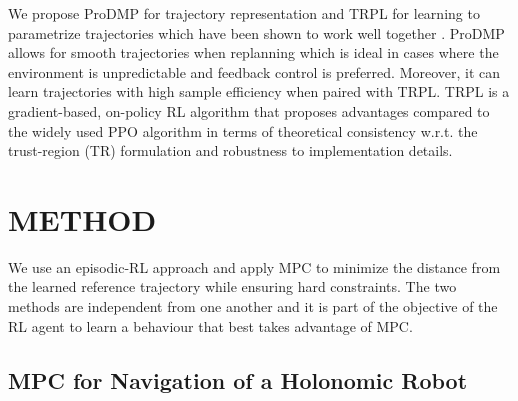 \documentclass[letterpaper,conference,10pt]{IEEEconf}
\begin{document}
We propose ProDMP \cite{paraschos_probabilistic_2013,li_prodmps_2022} for trajectory representation and TRPL \cite{otto_differentiable_2020} for learning to parametrize trajectories which have been shown to work well together \cite{otto_deep_2023}. ProDMP allows for smooth trajectories when replanning which is ideal in cases where the environment is unpredictable and feedback control is preferred. Moreover, it can learn trajectories with high sample efficiency when paired with TRPL. TRPL is a gradient-based, on-policy RL algorithm that proposes advantages compared to the widely used PPO algorithm in terms of theoretical consistency w.r.t. the trust-region (TR) formulation and robustness to implementation details.

\section{METHOD}

We use an episodic-RL approach and apply MPC to minimize the distance from the learned reference trajectory while ensuring hard constraints. The two methods are independent from one another and it is part of the objective of the RL agent to learn a behaviour that best takes advantage of MPC.

\subsection{MPC for Navigation of a Holonomic Robot}\label{sec:mpc}
\end{document}
